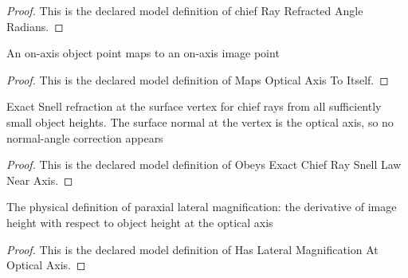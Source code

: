 \begin{proof}
  This is the declared model definition of chief Ray Refracted Angle Radians.
\end{proof}
\begin{definition}
  \label{def:physics:phyx-mini-0041:phyxminiproblems-problemphyxmini0041-mapsopticalaxistoitself}
  An on-axis object point maps to an on-axis image point
\end{definition}
\begin{proof}
  This is the declared model definition of Maps Optical Axis To Itself.
\end{proof}
\begin{definition}
  \label{def:physics:phyx-mini-0041:phyxminiproblems-problemphyxmini0041-obeysexactchiefraysnelllawnearaxis}
  Exact Snell refraction at the surface vertex for chief rays from all sufficiently small object heights. The surface normal at the vertex is the optical axis, so no normal-angle correction appears
\end{definition}
\begin{proof}
  This is the declared model definition of Obeys Exact Chief Ray Snell Law Near Axis.
\end{proof}
\begin{definition}
  \label{def:physics:phyx-mini-0041:phyxminiproblems-problemphyxmini0041-haslateralmagnificationatopticalaxis}
  The physical definition of paraxial lateral magnification: the derivative of image height with respect to object height at the optical axis
\end{definition}
\begin{proof}
  This is the declared model definition of Has Lateral Magnification At Optical Axis.
\end{proof}

